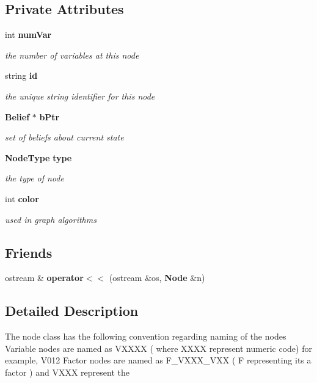 \subsection*{Private Attributes}
\begin{CompactItemize}
\item 
int {\bf numVar}
\begin{CompactList}\small\item\em the number of variables at this node \item\end{CompactList}\item 
string {\bf id}
\begin{CompactList}\small\item\em the unique string identifier for this node \item\end{CompactList}\item 
{\bf Belief} $\ast$ {\bf bPtr}
\begin{CompactList}\small\item\em set of beliefs about current state \item\end{CompactList}\item 
{\bf NodeType} {\bf type}
\begin{CompactList}\small\item\em the type of node \item\end{CompactList}\item 
int {\bf color}
\begin{CompactList}\small\item\em used in graph algorithms \item\end{CompactList}\end{CompactItemize}
\subsection*{Friends}
\begin{CompactItemize}
\item 
ostream \& {\bf operator$<$$<$} (ostream \&os, {\bf Node} \&n)
\end{CompactItemize}


\subsection{Detailed Description}
The node class has the following convention regarding naming of the nodes Variable nodes are named as VXXXX ( where XXXX represent numeric code) for example, V012 Factor nodes are named as F\_\-VXXX\_\-VXX ( F representing its a factor ) and VXXX represent the 



